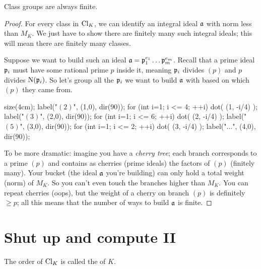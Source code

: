 \begin{corollary}
	Class groups are always finite.
\end{corollary}
\begin{proof}
	For every class in $\Cl_K$,
	we can identify an integral ideal $\aa$ with norm less than $M_K$.
	We just have to show there are finitely many such integral ideals;
	this will mean there are finitely many classes.

	Suppose we want to build such an ideal $\aa = \pp_1^{e_1} \dots \pp_m^{e_m}$.
	Recall that a prime ideal $\pp_i$ must have some rational prime $p$ inside it,
	meaning $\pp_i$ divides $(p)$ and $p$ divides $\Norm(\pp_i)$.
	So let's group all the $\pp_i$ we want to build $\aa$ with based on which $(p)$ they came from.
	\begin{center}
		\begin{asy}
			size(4cm);
			label("$(2)$", (1,0), dir(90));
			for (int i=1; i <= 4; ++i) dot( (1, -i/4) );
			label("$(3)$", (2,0), dir(90));
			for (int i=1; i <= 6; ++i) dot( (2, -i/4) );
			label("$(5)$", (3,0), dir(90));
			for (int i=1; i <= 2; ++i) dot( (3, -i/4) );
			label("$\dots$", (4,0), dir(90));
		\end{asy}
	\end{center}
	To be more dramatic: imagine you have a \emph{cherry tree};
	each branch corresponds to a prime $(p)$
	and contains as cherries (prime ideals) the factors of $(p)$ (finitely many).
	Your bucket (the ideal $\aa$ you're building) can only hold a total weight
	(norm) of $M_K$.  So you can't even touch the branches higher than $M_K$.
	You can repeat cherries (oops),
	but the weight of a cherry on branch $(p)$ is definitely $\ge p$;
	all this means that the number of ways to build $\aa$ is finite.
\end{proof}

\section{Shut up and compute II}
\begin{definition}
The order of $\Cl_K$ is called the  of $K$.
\end{definition}

